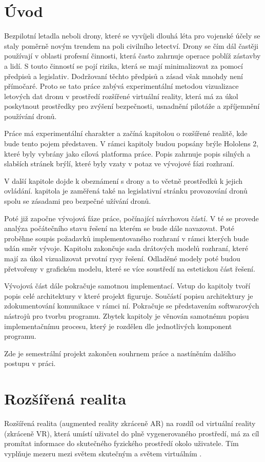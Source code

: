 
\chapter{Úvod}
Bezpilotní letadla neboli drony, které se vyvíjeli dlouhá léta pro vojenské účely se staly poměrně novým trendem na poli civilního letectví. Drony se čím dál častěji používají v oblasti profesní činnosti, která často zahrnuje operace poblíž zástavby a lidí. S touto činností se pojí rizika, která se mají minimalizovat za pomocí předpisů a legislativ. Dodržovaní těchto předpisů a zásad však mnohdy není přímočaré. Proto se tato práce zabývá experimentální metodou vizualizace letových dat dronu v prostředí rozšířené virtuální reality, která má za úkol poskytnout prostředky pro zvýšení bezpečnosti, usnadnění pilotáže a zpříjemnění používání dronů. 

Práce má experimentální charakter a začíná kapitolou o rozšířené realitě, kde bude tento pojem představen. V rámci kapitoly budou popsány brýle Hololens 2, které byly vybrány jako cílová platforma práce. Popis zahrnuje popis silných a slabších stránek brýlí, které byly vzaty v potaz ve vývojové fázi rozhraní.

V další kapitole dojde k obeznámení s drony a to včetně prostředků k jejich ovládání. kapitola je zaměřená také na legislativní stránku provozování dronů spolu se zásadami pro bezpečné užívání dronů. 

Poté již započne vývojová fáze práce, počínající návrhovou částí. V té se provede analýza počátečního stavu řešení na kterém se bude dále navazovat. Poté proběhne soupis požadavků implementovaného rozhraní v rámci kterých bude udán směr vývoje. Kapitolu zakončuje sada drátových modelů rozhraní, které mají za úkol vizualizovat prvotní rysy řešení. Odladěné modely poté budou přetvořeny v grafickém modelu, které se více soustředí na estetickou část řešení.

Vývojová část dále pokračuje samotnou implementací. Vstup do kapitoly tvoří popis celé architektury v které projekt figuruje. Součástí popisu architektury je zdokumentování komunikace v rámci ní. Pokračuje se představením softwarových nástrojů pro tvorbu programu. Zbytek kapitoly je věnován samotnému popisu implementačnímu procesu, který je rozdělen dle jednotlivých komponent programu.

Zde je semestrální projekt zakončen souhrnem práce a nastíněním dalšího postupu v práci.

\chapter{Rozšířená realita}
Rozšířená realita (augmented reality zkráceně AR) na rozdíl od virtuální reality (zkráceně VR), která umístí uživatel do plně vygenerovaného prostředí, má za cíl promítat informace do skutečného fyzického prostředí okolo uživatele. Tím vyplňuje mezeru mezi světem skutečným a světem virtuálním  \cite{Kniha2SchmalstiegDieter2016Ar:p}.

